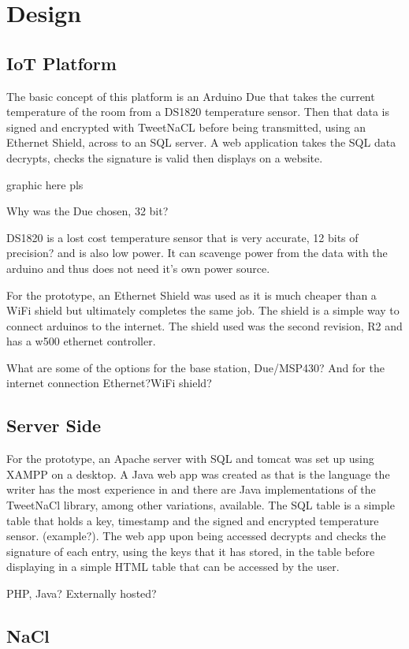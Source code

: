 
\chapter{Design}
\label{design}



\section{IoT Platform}

The basic concept of this platform is an Arduino Due that takes the current temperature of the room from a DS1820 temperature sensor. Then that data is signed and encrypted with TweetNaCL before being transmitted, using an Ethernet Shield, across to an SQL server. A web application takes the SQL data decrypts, checks the signature is valid then displays on a website. 

graphic here pls

Why was the Due chosen, 32 bit?

DS1820 is a lost cost temperature sensor that is very accurate, 12 bits of precision? and is also low power. It can scavenge power from the data with the arduino and thus does not need it's own power source. 


For the prototype, an Ethernet Shield was used as it is much cheaper than a WiFi shield but ultimately completes the same job. The shield is a simple way to connect arduinos to the internet. The shield used was the second revision, R2 and has a w500 ethernet controller. 


What are some of the options for the base station, Due/MSP430?  And for the internet connection   Ethernet?WiFi shield?

\section{Server Side}

For the prototype, an Apache server with SQL and tomcat was set up using XAMPP on a desktop. A Java web app was created as that is the language the writer has the most experience in and there are Java implementations of the TweetNaCl library, among other variations, available. The SQL table is a simple table that holds a key, timestamp and the signed and encrypted temperature sensor. (example?). The web app upon being accessed decrypts and checks the signature of each entry, using the keys that it has stored, in the table before displaying in a simple HTML table that can be accessed by the user. 

PHP, Java? Externally hosted?

\section{NaCl}